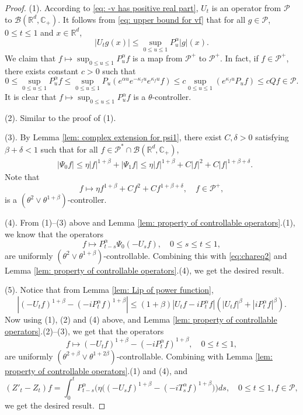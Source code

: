 \documentclass[12pt,a4paper]{amsart}
\theoremstyle{plain}
\theoremstyle{definition}
\numberwithin{equation}{section}
\begin{document}
\begin{proof}
    (1). According to \eqref{eq: -v has positive real part}, $U_t$ is an operator from $\mathcal P$ to $\mathcal B(\mathbb R^d, \mathbb C_+)$.
    It follows from \eqref{eq: upper bound for vf} that for all $g\in \mathcal P$, $0\leq t\leq 1$ and $x\in \mathbb R^d$,
\[
    |U_t g(x)|
    \leq \sup_{0\leq u\leq 1}P_u^\alpha |g| (x).
\]
  We claim that $f\mapsto\sup_{0\leq u\leq 1}P^{\alpha}_u f$ is a map from $\mathcal P^+$ to $\mathcal P^+$. In fact, if $f\in \mathcal P^+$, there exists constant $c>0$ such that
\[
	0
	\leq \sup_{0\leq u\leq 1}P^{\alpha}_u f
	\leq \sup_{0\leq u\leq 1} P_u (e^{\alpha u} e^{-\kappa_f u} e^{\kappa_f u} f )
	\leq c \sup_{0\leq u\leq 1} (e^{\kappa_fu}P_u f) \leq c Qf \in \mathcal P.
\]
	It is clear that $f\mapsto\sup_{0\leq u\leq 1}P^{\alpha}_u f$ is a $\theta$-controller.


    (2). Similar to the proof of (1).

    (3).
        By Lemma \ref{lem: complex extension for psi1},
         there exist $C, \delta >0$ 
         satisfying $\beta+\delta< 1$ such that for all
         $f\in \mathcal P^* \cap \mathcal B(\mathbb R^d, \mathbb C_+)$,
\begin{align}
    &|\Psi_0 f|
    \leq \eta |f|^{1+\beta} + |\Psi_1 f|
    \leq \eta |f|^{1+\beta} + C|f|^2+ C |f|^{1+\beta + \delta}.
\end{align}
    Note that
\[
    f \mapsto \eta f^{1+\beta} + Cf^2+ Cf^{1+\beta + \delta},\quad f\in \mathcal P^+,
\]
    is a $(\theta^2 \vee \theta^{1+\beta})$-controller.

    (4). 
From (1)--(3) above and Lemma \ref{lem: property of controllable operators}.(1), 
we know that the operators
\[
    f\mapsto P^\alpha_{t-s}\Psi_0(-U_sf),
    \quad 0\leq s\leq t\leq 1,
\]
    are uniformly $(\theta^2\vee \theta^{1+\beta})$-controllable.
    Combining this with \eqref{eq:chareq2} and 
    Lemma \ref{lem: property of controllable operators}.(4), we get the desired result.

    (5). Notice that from Lemma \ref{lem: Lip of power function},
\[
    |(-U_t f)^{1+\beta} - (-iP^\alpha_t f)^{1+\beta} |
    \leq  (1+\beta) |U_t f-iP^\alpha_t f|(|U_t f|^{\beta}+|i P^\alpha_t f|^{\beta}).
\]
Now using (1), (2) and  (4) above, and Lemma \ref{lem: property of controllable operators}.(2)--(3), we get that the operators
\[
    f \mapsto (-U_t f)^{1+\beta} - (-iP^\alpha_t f)^{1+\beta},\quad 0\leq t\leq 1,
\]
    are uniformly $(\theta^{2+\beta}\vee \theta^{1+2\beta})$-controllable.
    Combining with Lemma \ref{lem: property of controllable operators}.(1) and (4), and
\begin{equation}
    (Z'_t - Z_t)f = \int_0^t P^\alpha_{t-s}\Big( \eta \big((-U_s f)^{1+\beta} - (-iT_s^\alpha f)^{1+\beta} \big)\Big)ds,
    \quad 0\leq t\leq 1, f\in \mathcal P,
\end{equation}
    we get the desired result.


\end{proof}
\end{document}
